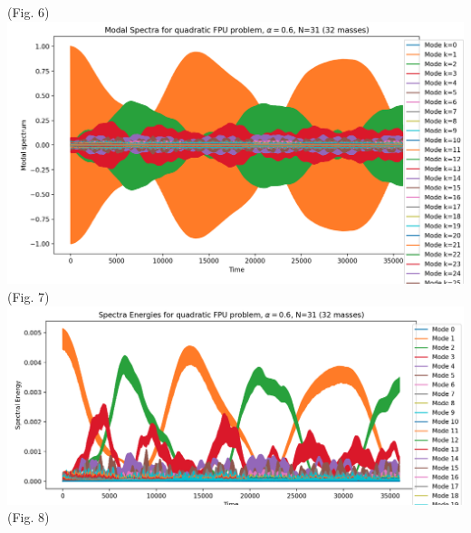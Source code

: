 \documentclass{article}
\begin{document}
\begin{center}
    (Fig. 6)\\ 
    \includegraphics[scale=.36]{modea6k1.png}\\ 
    (Fig. 7)
    \includegraphics[scale=.36]{modeE.png}\\ 
    (Fig. 8)
\end{center} 
\end{document}
